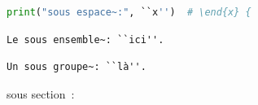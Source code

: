 \begin{lstlisting}[language=Python]
print("sous espace~:", ``x'')  # \end{x} {
\end{lstlisting}
\begin{verbatim}
Le sous ensemble~: ``ici''.
\end{verbatim}
\begin{Verbatim}[frame=single]
Un sous groupe~: ``là''.
\end{Verbatim}
\begin{verbatim*}
sous section~:
\end{verbatim*}
